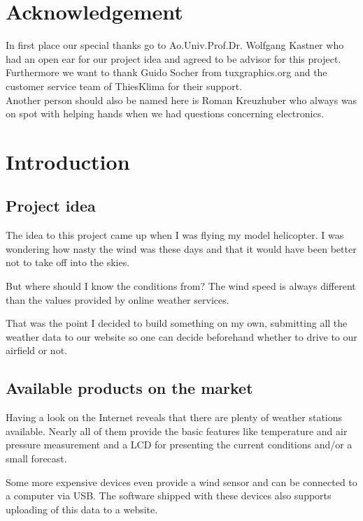 
\chapter*{Acknowledgement}

In first place our special thanks go to Ao.Univ.Prof.Dr. Wolfgang Kastner who had an open ear for our project idea and agreed to be advisor for this project.\\[12pt]

\noindent Furthermore we want to thank Guido Socher from tuxgraphics.org and the customer service team of ThiesKlima for their support.\\[12pt]

\noindent Another person should also be named here is Roman Kreuzhuber who always was on spot with helping hands when we had questions concerning electronics. 

\chapter{Introduction}

\section{Project idea}
The idea to this project came up when I was flying my model helicopter. I was wondering how nasty the wind was these days and that it would have been better not to take off into the skies.

But where should I know the conditions from? The wind speed is always different than the values provided by online weather services.

That was the point I decided to build something on my own, submitting all the weather data to our website so one can decide beforehand whether to drive to our airfield or not.

\section{Available products on the market}
Having a look on the Internet reveals that there are plenty of weather stations available. Nearly all of them provide the basic features like temperature and air pressure measurement and a LCD for presenting the current conditions and/or a small forecast.

Some more expensive devices even provide a wind sensor and can be connected to a computer via USB. The software shipped with these devices also supports uploading of this data to a website.

